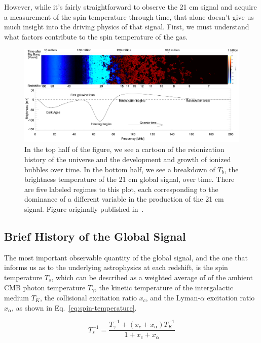 However, while it's fairly straightforward to observe the 21 cm signal and 
acquire a measurement of the spin temperature through time, that alone doesn't 
give us much insight into the driving physics of that signal. First, we must 
understand what factors contribute to the spin temperature of the gas.

\begin{figure}
    \begin{center}
    \includegraphics[width=\linewidth]{global_signal.png}
    \end{center}
    \caption{
        In the top half of the figure, we see a cartoon of the reionization 
        history of the universe and the development and growth of ionized 
        bubbles over time. In the bottom half, we see a breakdown of $T_b$, the 
        brightness temperature of the 21 cm global signal, over time. There are 
        five labeled regimes to this plot, each corresponding to the dominance 
        of a different variable in the production of the 21 cm signal. Figure 
        originally published in~\citealp{pritchard-loeb2012}.
    }
    \label{fig:global-signal}
\end{figure}

\subsection{Brief History of the Global Signal}

The most important observable quantity of the global signal, and the one that 
informs us as to the underlying astrophysics at each redshift, is the spin 
temperature $T_s$, which can be described as a weighted average of of the 
ambient CMB photon temperature $T_\gamma$, the kinetic temperature of the 
intergalactic medium $T_K$, the collisional excitation ratio $x_c$, and the 
Lyman-$\alpha$ excitation ratio $x_\alpha$, as shown in 
Eq.~\eqref{eq:spin-temperature}.

\begin{equation}
    T_s^{-1} = \frac{T_\gamma^{-1} + (x_c + x_\alpha) T_K^{-1}}{1 + x_c + 
    x_\alpha}
    \label{eq:spin-temperature}
\end{equation}

